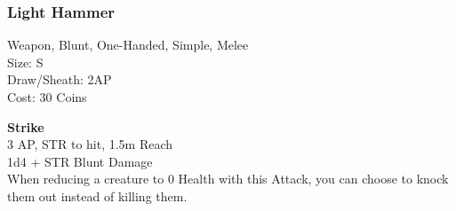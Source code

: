 \subsubsection{Light Hammer}\label{weapon:lightHammer}
Weapon, Blunt, One-Handed, Simple, Melee\\
Size: S\\
Draw/Sheath: 2AP\\
Cost: 30 Coins

\textbf{Strike} \\
3 AP, STR to hit, 1.5m Reach\\
1d4 + \texttimes STR Blunt Damage\\
When reducing a creature to 0 Health with this Attack, you can choose to knock them out instead of killing them.
